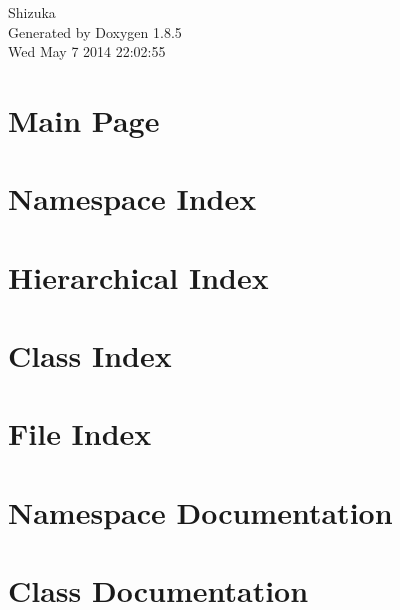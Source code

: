 \documentclass[twoside]{book}
\newcommand{\clearemptydoublepage}{%
  \newpage{\pagestyle{empty}\cleardoublepage}%
}
\begin{document}
\hypersetup{pageanchor=false}
\begin{titlepage}
\vspace*{7cm}
\begin{center}%
{\Large Shizuka }\\
\vspace*{1cm}
{\large Generated by Doxygen 1.8.5}\\
\vspace*{0.5cm}
{\small Wed May 7 2014 22:02:55}\\
\end{center}
\end{titlepage}
\clearemptydoublepage
\tableofcontents
\clearemptydoublepage
{}
\hypersetup{pageanchor=true}

\chapter{Main Page}
\label{index}\hypertarget{index}{}
\chapter{Namespace Index}

\chapter{Hierarchical Index}

\chapter{Class Index}

\chapter{File Index}

\chapter{Namespace Documentation}










\chapter{Class Documentation}








\end{document}
